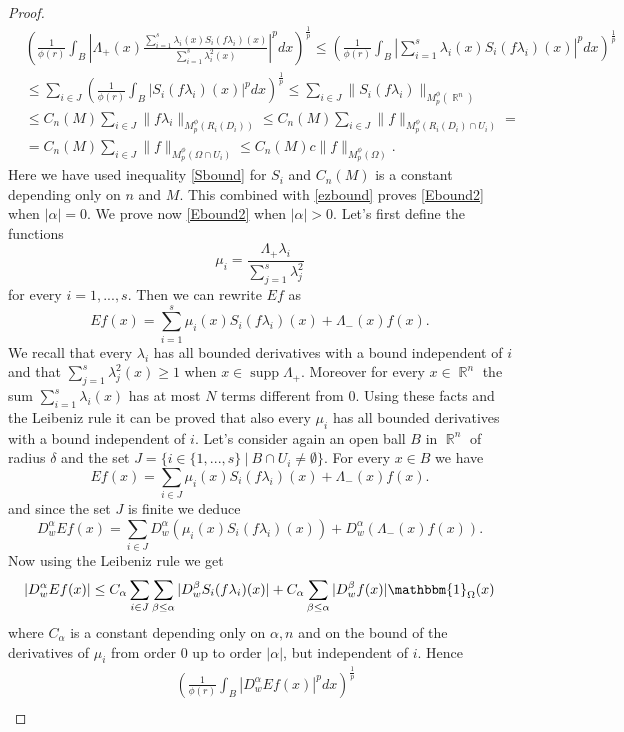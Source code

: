 \documentclass[12pt]{article}
\theoremstyle{definition}
\DeclareMathOperator\supp{supp}
\DeclareMathOperator\rr{\mathbb{R}}
\begin{document}
\begin{proof}
\begin{align*}
&\left( \frac{1}{\phi(r)} \int_B \left|\Lambda_+(x) \frac{\sum_{i=1}^s \lambda_i(x)S_i(f\lambda_i)(x)}{\sum_{i=1}^s \lambda_i^2(x)}\right|^pdx \right)^\frac{1}{p}\le   \left( \frac{1}{\phi(r)} \int_{B}|\sum_{i=1}^s \lambda_i(x)S_i(f\lambda_i)(x)|^pdx \right)^\frac{1}{p} \\
& \le  \sum_{i\in J}  \left( \frac{1}{\phi(r)} \int_{B} |S_i(f\lambda_i)(x)|^pdx \right)^\frac{1}{p} \le \sum_{i\in J} \| S_i(f\lambda_i)\|_{M_p^\phi(\rr^n)} \\
& \le C_n(M) \sum_{i\in J} \| f\lambda_i\|_{M_p^\phi(R_i(D_i))} \le C_n(M) \sum_{i\in J} \| f\|_{M_p^\phi(R_i(D_i)\cap U_i)}=\\
&= C_n(M)\sum_{i\in J} \| f\|_{M_p^\phi(\Omega \cap U_i)} \le C_n(M) c\| f\|_{M_p^\phi(\Omega )}.
\end{align*}
Here we have used inequality \eqref{Sbound} for $S_i$ and $C_n(M)$ is a constant depending only on $n$ and $M$. This combined with \eqref{ezbound} proves \eqref{Ebound2} when $|\alpha|=0.$ We prove now \eqref{Ebound2} when $|\alpha|>0.$ Let's first define the functions
\[ \mu_i=\frac{\Lambda_+\lambda_i}{\sum_{j=1}^s\lambda^2_j}\]
for every $i=1,...,s.$ Then we can rewrite $Ef$ as
\[ Ef(x)=\sum_{i=1}^s \mu_i(x)S_i(f\lambda_i)(x)+\Lambda_-(x)f(x).\]
We recall that every $\lambda_i$ has all bounded derivatives with a bound independent of $i$ and that $\sum_{j=1}^s\lambda^2_j(x)\ge 1$ when $x \in \supp \Lambda_+.$ Moreover for every $x\in \rr^n$ the sum $\sum_{i=1}^s\lambda_i(x)$ has at most $N$ terms different from $0$. Using these facts and the Leibeniz rule it can be proved that also every $\mu_i$ has all bounded derivatives with a bound independent of $i$. Let's consider again an open ball $B$ in $\rr^n$ of radius $\delta$ and the set $J=\{i \in \{1,...,s\} \ | \ B\cap U_i \neq \emptyset\}$. For every $x \in B$ we have
\[ Ef(x)=\sum_{i \in J} \mu_i(x)S_i(f\lambda_i)(x)+\Lambda_-(x)f(x).\]
and since the set $J$ is finite we deduce
\[ D^\alpha_wEf(x)=\sum_{i \in J} D^\alpha_w(\mu_i(x)S_i(f\lambda_i)(x))+D^\alpha_w(\Lambda_-(x)f(x)).\]
Now using the Leibeniz rule we get
\[ |D^\alpha_wEf(x)|\le C_\alpha\sum_{i \in J} \sum_{\beta\le \alpha} |D^\beta_wS_i(f\lambda_i)(x)|+C_\alpha\sum_{\beta\le \alpha} |D^\beta_w f(x)|\mathbbm{1}_\Omega(x)\]
where $C_\alpha$ is a constant depending only on $\alpha,n$ and on the bound of the derivatives of $\mu_i$ from order 0 up to order $|\alpha|$, but independent of $i.$ Hence 
\begin{align*}
&\left( \frac{1}{\phi(r)} \int_B |D^\alpha_w Ef(x)|^pdx \right)^\frac{1}{p} \\

\end{align*}
\end{proof}
\end{document}
